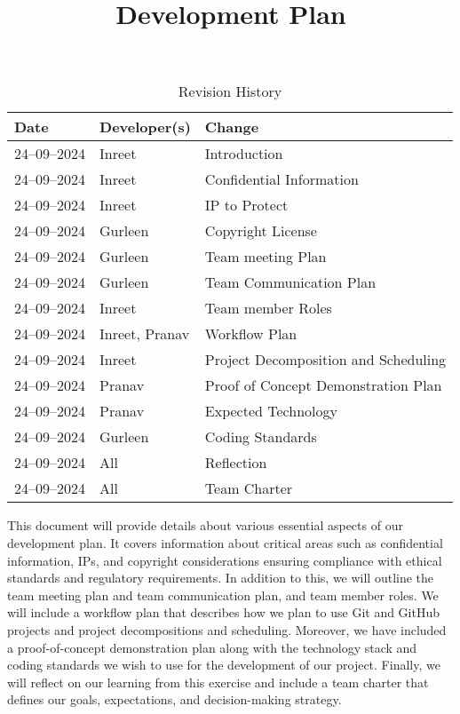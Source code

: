 \documentclass{article}
\title{Development Plan\\\progname}
\author{\authname}
\date{}
\begin{document}
\maketitle

\begin{table}[hp]
\caption{Revision History} \label{TblRevisionHistory}
\begin{tabularx}{\textwidth}{llX}
\toprule
\textbf{Date} & \textbf{Developer(s)} & \textbf{Change}\\
\midrule
24--09--2024 & Inreet & Introduction\\
24--09--2024 & Inreet & Confidential Information\\
24--09--2024 & Inreet & IP to Protect\\
24--09--2024 & Gurleen & Copyright License\\
24--09--2024 & Gurleen & Team meeting Plan\\
24--09--2024 & Gurleen & Team Communication Plan\\
24--09--2024 & Inreet & Team member Roles\\
24--09--2024 & Inreet, Pranav & Workflow Plan\\
24--09--2024 & Inreet & Project Decomposition and Scheduling\\
24--09--2024 & Pranav & Proof of Concept Demonstration Plan\\
24--09--2024 & Pranav & Expected Technology\\
24--09--2024 & Gurleen & Coding Standards\\
24--09--2024 & All & Reflection\\
24--09--2024 & All & Team Charter\\
\bottomrule
\end{tabularx}
\end{table}

\newpage{}

This document will provide details about various essential aspects of our development plan. It covers information about critical areas such as confidential information, IPs, and copyright considerations ensuring compliance with ethical standards and regulatory requirements. In addition to this, we will outline the team meeting plan and team communication plan, and team member roles. We will include a workflow plan that describes how we plan to use Git and GitHub projects and project decompositions and scheduling. Moreover, we have included a proof-of-concept demonstration plan along with the technology stack and coding standards we wish to use for the development of our project. Finally, we will reflect on our learning from this exercise and include a team charter that defines our goals, expectations, and decision-making strategy.
\end{document}
